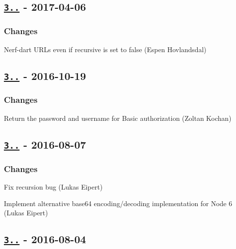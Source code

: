 \subsection*{\href{https://github.com/rexxars/registry-auth-token/compare/v3.1.0...v3.1.1}{\tt 3..} -\/ 2017-\/04-\/06}

\subsubsection*{Changes}


\begin{DoxyItemize}
\item Nerf-\/dart U\+R\+Ls even if recursive is set to false (Espen Hovlandsdal)
\end{DoxyItemize}

\subsection*{\href{https://github.com/rexxars/registry-auth-token/compare/v3.0.1...v3.1.0}{\tt 3..} -\/ 2016-\/10-\/19}

\subsubsection*{Changes}


\begin{DoxyItemize}
\item Return the password and username for Basic authorization (Zoltan Kochan)
\end{DoxyItemize}

\subsection*{\href{https://github.com/rexxars/registry-auth-token/compare/v3.0.0...v3.0.1}{\tt 3..} -\/ 2016-\/08-\/07}

\subsubsection*{Changes}


\begin{DoxyItemize}
\item Fix recursion bug (Lukas Eipert)
\item Implement alternative base64 encoding/decoding implementation for Node 6 (Lukas Eipert)
\end{DoxyItemize}

\subsection*{\href{https://github.com/rexxars/registry-auth-token/compare/v2.1.1...v3.0.0}{\tt 3..} -\/ 2016-\/08-\/04}

